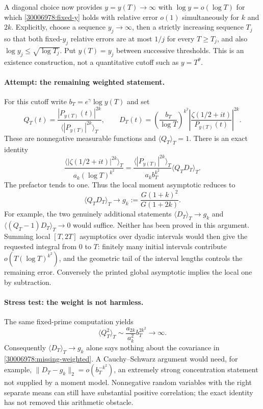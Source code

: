 \documentclass[11pt,a4paper]{article}
\numberwithin{equation}{section}
\begin{document}
A diagonal choice now provides $y=y(T)\to\infty$ with
$\log y=o(\log T)$ for which
\eqref{30006978:fixed-y} holds with relative error $o(1)$ simultaneously for
$k$ and $2k$. Explicitly, choose a sequence $y_j\to\infty$, then a
strictly increasing sequence $T_j$ so that both fixed-$y_j$ relative
errors are at most $1/j$ for every $T\ge T_j$, and also
$\log y_j\le\sqrt{\log T_j}$. Put $y(T)=y_j$ between successive thresholds.
This is an existence construction, not a quantitative cutoff such as
$y=T^\theta$.

\paragraph{Attempt: the remaining weighted statement.}
For this cutoff write $b_T=e^\gamma\log y(T)$ and set
\[
 Q_T(t)=\frac{|P_{y(T)}(t)|^{2k}}
                   {\langle|P_{y(T)}|^{2k}\rangle_T},\qquad
 D_T(t)=\left(\frac{b_T}{\log T}\right)^{k^2}
          \left|\frac{\zeta(1/2+it)}{P_{y(T)}(t)}\right|^{2k}.
\]
These are nonnegative measurable functions and $\langle Q_T\rangle_T=1$.
There is an exact identity
\begin{equation}\label{30006978:weighted-identity}
 \frac{\langle|\zeta(1/2+it)|^{2k}\rangle_T}
        {a_k(\log T)^{k^2}}
 =\frac{\langle|P_{y(T)}|^{2k}\rangle_T}{a_k b_T^{k^2}}
       \langle Q_TD_T\rangle_T.
\end{equation}
The prefactor tends to one. Thus the local moment asymptotic reduces to
\begin{equation}\label{30006978:missing-weighted}
 \langle Q_TD_T\rangle_T\longrightarrow
 g_k:=\frac{G(1+k)^2}{G(1+2k)}.
\end{equation}
For example, the two genuinely additional statements
$\langle D_T\rangle_T\to g_k$ and
$\langle(Q_T-1)D_T\rangle_T\to0$ would suffice. Neither has been proved
in this argument. Summing local $[T,2T]$ asymptotics over dyadic intervals
would then give the requested integral from $0$ to $T$: finitely many
initial intervals contribute $o(T(\log T)^{k^2})$, and the geometric tail
of the interval lengths controls the remaining error. Conversely the
printed global asymptotic implies the local one by subtraction.

\paragraph{Stress test: the weight is not harmless.}
The same fixed-prime computation yields
\begin{equation}\label{30006978:variance}
 \langle Q_T^2\rangle_T
 \sim\frac{a_{2k}}{a_k^2}b_T^{2k^2}\longrightarrow\infty.
\end{equation}
Consequently $\langle D_T\rangle_T\to g_k$ alone says nothing about the
covariance in \eqref{30006978:missing-weighted}. A Cauchy--Schwarz argument
would need, for example,
$\|D_T-g_k\|_2=o(b_T^{-k^2})$, an extremely strong concentration
statement not supplied by a moment model. Nonnegative random variables
with the right separate means can still have substantial positive
correlation; the exact identity has not removed this arithmetic obstacle.
\end{document}
